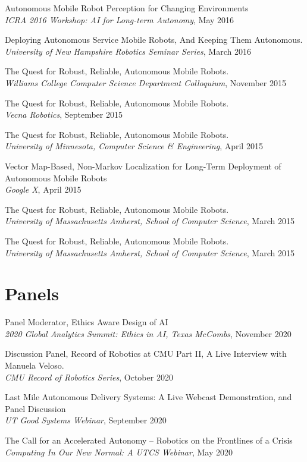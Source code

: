 \documentclass[Times]{article}
\begin{document}
Autonomous Mobile Robot Perception for Changing Environments\\
{\em ICRA 2016 Workshop: AI for Long-term Autonomy}, May 2016

Deploying Autonomous Service Mobile Robots, And Keeping Them Autonomous.\\
{\em University of New Hampshire Robotics Seminar Series}, March 2016

The Quest for Robust, Reliable, Autonomous Mobile Robots.\\
{\em Williams College Computer Science Department Colloquium}, November 2015

The Quest for Robust, Reliable, Autonomous Mobile Robots.\\
{\em Vecna Robotics}, September 2015

The Quest for Robust, Reliable, Autonomous Mobile Robots.\\
{\em University of Minnesota, Computer Science \& Engineering}, April 2015

Vector Map-Based, Non-Markov Localization for Long-Term Deployment of Autonomous Mobile Robots\\
{\em Google X}, April 2015

The Quest for Robust, Reliable, Autonomous Mobile Robots.\\
{\em University of Massachusetts Amherst, School of Computer Science}, March 2015

The Quest for Robust, Reliable, Autonomous Mobile Robots.\\
{\em University of Massachusetts Amherst, School of Computer Science}, March 2015


\section*{Panels}
Panel Moderator, Ethics Aware Design of AI\\
{\em 2020 Global Analytics Summit: Ethics in AI, Texas McCombs}, November 2020

Discussion Panel, Record of Robotics at CMU Part II, A Live Interview with
Manuela Veloso.\\
{\em CMU Record of Robotics Series}, October 2020

Last Mile Autonomous Delivery Systems: A Live Webcast Demonstration, and Panel Discussion\\
{\em UT Good Systems Webinar}, September 2020

The Call for an Accelerated Autonomy -- Robotics on the Frontlines of a Crisis\\
{\em Computing In Our New Normal: A UTCS Webinar}, May 2020
\end{document}
